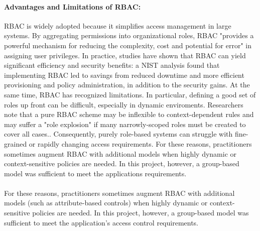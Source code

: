 \documentclass[a4paper,12pt]{report}
\begin{document}
\paragraph{Advantages and Limitations of RBAC:} RBAC is widely adopted because it simplifies access management in large systems. By aggregating permissions into organizational roles, RBAC "provides a powerful mechanism for reducing the complexity, cost and potential for error" in assigning user privileges. In practice, studies have shown that RBAC can yield significant efficiency and security benefits: a NIST analysis found that implementing RBAC led to savings from reduced downtime and more efficient provisioning and policy administration, in addition to the security gains. At the same time, RBAC has recognized limitations. In particular, defining a good set of roles up front can be difficult, especially in dynamic enviroments. Researchers note that a pure RBAC scheme may be inflexible to context-dependent rules and may suffer a "role explosion" if many narrowly-scoped roles must be created to cover all cases.. Consequently, purely role-based systems can struggle with fine-grained or rapidly changing access requirements. For these reasons, practitioners sometimes augment RBAC with additional models when highly dynamic or context-sensitive policies are needed. In this project, however, a group-based model was sufficient to meet the applications requirements.\\\\For these reasons, practitioners sometimes augment RBAC with additional models (such as attribute-based controls) when highly dynamic or context-sensitive policies are needed. In this project, however, a group-based model was sufficient to meet the application's access control requirements. \parencite{rbac} \\ \\
\end{document}

